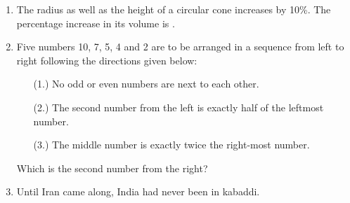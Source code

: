 \documentclass[journal]{IEEEtran}
\numberwithin{equation}{enumi}
\numberwithin{figure}{enumi}
\begin{document}
\begin{enumerate}
\bigskip

\item The radius as well as the height of a circular cone increases by 10\%. The percentage increase in its volume is \underline{\hspace{2cm}}.\\
\begin{enumerate}
\end{enumerate}

\bigskip

\item Five numbers 10, 7, 5, 4 and 2 are to be arranged in a sequence from left to right following the directions given below:\\
\begin{enumerate}
    \item[(1.)] No odd or even numbers are next to each other.
    \item[(2.)] The second number from the left is exactly half of the leftmost number.
    \item[(3.)] The middle number is exactly twice the right-most number.
\end{enumerate}
Which is the second number from the right?\\
\begin{enumerate}
\end{enumerate}

\bigskip

\item Until Iran came along, India had never been \underline{\hspace{2cm}} in kabaddi.\\
\begin{enumerate}
\end{enumerate}


\end{enumerate}
\end{document}
